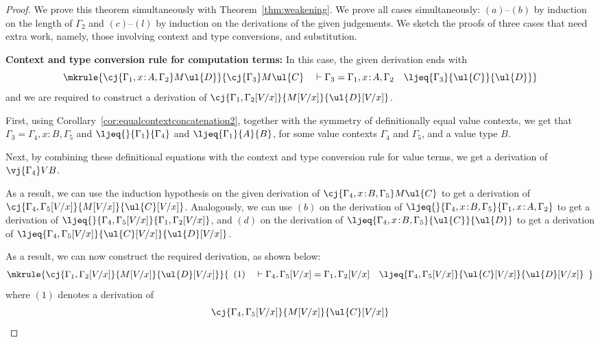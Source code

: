 \begin{proof}
We prove this theorem simultaneously with Theorem~\ref{thm:weakening}.
We prove all cases simultaneously: $(a)$--$(b)$ by induction on the length of $\Gamma_2$ and $(c)$--$(l)$ by induction on the derivations of the given judgements. We sketch the proofs of three cases that need extra work, namely, those involving context and type conversions, and substitution.

\vspace{0.2cm}

\noindent \textbf{Context and type conversion rule for computation terms:}
In this case, the given derivation ends with
\[
\mkrule
{\cj {\Gamma_1, x \!:\! A,\Gamma_2} M {\ul{D}}}
{\cj {\Gamma_3} M {\ul{C}} \quad \vdash \Gamma_3 = \Gamma_1, x \!:\! A,\Gamma_2 \quad \ljeq {\Gamma_3} {\ul{C}} {\ul{D}}}
\]
and we are required to construct a derivation of ${\cj {\Gamma_1, \Gamma_2[V/x]} {M[V/x]} {\ul{D}[V/x]}}$.

First, using Corollary~\ref{cor:equalcontextconcatenation2}, together with the symmetry of definitionally equal value contexts, we get that $\Gamma_3 = \Gamma_4, x \!:\! B,\Gamma_5$ and $\ljeq{} {\Gamma_1} {\Gamma_4}$ and $\ljeq {\Gamma_1} {A} {B}$, for some value contexts $\Gamma_4$ and $\Gamma_5$, and a value type $B$. 

Next, by combining these definitional equations with the context and type conversion rule for value terms, we get a derivation of $\vj {\Gamma_4} V {B}$.  

As a result, we can use the induction hypothesis on the given derivation of \linebreak $\cj {\Gamma_4, x \!:\! B,\Gamma_5} M {\ul{C}}$ to get a derivation of $\cj {\Gamma_4,\Gamma_5[V/x]} {M[V/x]} {\ul{C}[V/x]}$. Analogously, we can use $(b)$ on the derivation of $\ljeq {} {\Gamma_4, x \!:\! B,\Gamma_5} {\Gamma_1, x \!:\! A,\Gamma_2}$ to get a derivation of  $\ljeq {} {\Gamma_4,\Gamma_5[V/x]} {\Gamma_1,\Gamma_2[V/x]}$, and $(d)$ on the derivation of $\ljeq {\Gamma_4, x \!:\! B,\Gamma_5} {\ul{C}} {\ul{D}}$ to get a derivation of $\ljeq {\Gamma_4,\Gamma_5[V/x]} {\ul{C}[V/x]} {\ul{D}[V/x]}$.

As a result, we can now construct the required derivation, as shown below:
\[
\mkrule
{\cj {\Gamma_1, \Gamma_2[V/x]} {M[V/x]} {\ul{D}[V/x]}}
{
\begin{array}{c}
(1)
\quad
\vdash \Gamma_4,\Gamma_5[V/x] = \Gamma_1,\Gamma_2[V/x] \quad \ljeq {\Gamma_4,\Gamma_5[V/x]} {\ul{C}[V/x]} {\ul{D}[V/x]}
\end{array}
}
\]
where $(1)$ denotes a derivation of
\[
\cj {\Gamma_4,\Gamma_5[V/x]} {M[V/x]} {\ul{C}[V/x]} 
\]


\end{proof}
